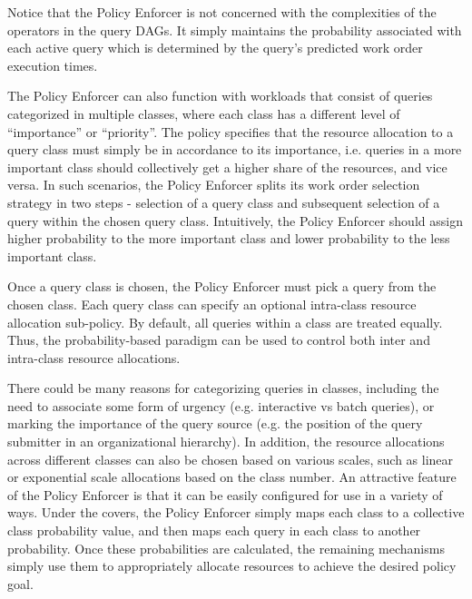 Notice that the Policy Enforcer is not concerned with the complexities of the operators in the query DAGs. 
It simply maintains the probability associated with each active query which is determined by the query's predicted work order execution times.

The Policy Enforcer can also function with workloads that consist of queries categorized in multiple classes, where each class has a different level of ``importance'' or ``priority''. 
The policy specifies that the resource allocation to a query class must simply be in accordance to its importance, i.e. queries in a more important class should collectively get a higher share of the resources, and vice versa.
In such scenarios, the Policy Enforcer splits its work order selection strategy in two steps - selection of a query class and subsequent selection of a 
query within the chosen query class.
Intuitively, the Policy Enforcer should assign higher probability to the more 
important class and lower probability to the less important class.

Once a query class is chosen, the Policy Enforcer must pick a query from the chosen class. 
Each query class can specify an optional intra-class resource allocation sub-policy. 
By default, all queries within a class are treated equally.
Thus, the probability-based paradigm can be used to control both inter and intra-class resource allocations.

There could be many reasons for categorizing queries in classes, including the need to associate some form of urgency (e.g. interactive vs batch queries), or marking the importance of the query source 
(e.g. the position of the query submitter in an organizational hierarchy). 
In addition, the resource allocations across different classes can also be chosen based on various scales, such as linear or exponential scale allocations based on the class number. 
An attractive feature of the Policy Enforcer is that it can be easily configured for use in a variety of ways.
Under the covers, the Policy Enforcer simply maps each class to a collective class probability value, and then maps each query in each class to another probability. 
Once these probabilities are calculated, the remaining mechanisms simply use them to appropriately allocate resources to achieve the desired policy goal.
